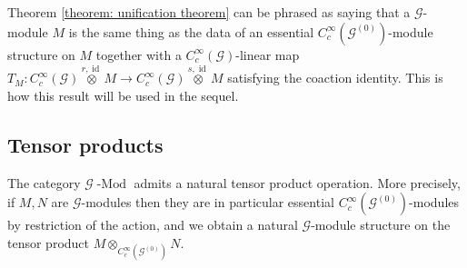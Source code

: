 \documentclass{amsart}
\newcommand{\G}{\mathcal{G}}
\newcommand{\ccinfty}{C_c^\infty}
\DeclareMathOperator{\id}{id}
\begin{document}
Theorem \ref{theorem: unification theorem} can be phrased as saying that a $ \G $-module $ M $ is the same thing as the data of an essential $ \ccinfty(\G^{(0)}) $-module structure on $ M $ together with a $ \ccinfty(\G) $-linear map $ T_M:\ccinfty(\G)\stackrel{r,\id}{\otimes} M \rightarrow \ccinfty(\G)\stackrel{s,\id}{\otimes} M $ satisfying the coaction identity. This is how this result will be used in the sequel. 


\subsection{Tensor products}

The category $ \G \operatorname{-Mod} $ admits a natural tensor product operation. More precisely, if $ M, N $ are $ \G $-modules then they are in particular essential $ \ccinfty(\G^{(0)}) $-modules by restriction of the action, and we obtain a natural $ \G $-module structure on the tensor product $ M \otimes_{\ccinfty(\G^{(0)})} N $. 
\end{document}
